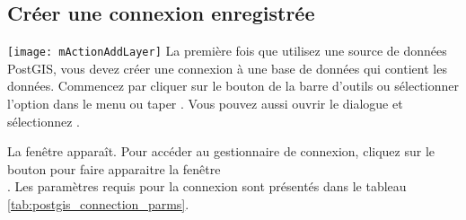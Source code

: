 \subsection{Créer une connexion enregistrée}  
\label{sec:postgis_stored}

\texttt{[image: mActionAddLayer]} La première fois que utilisez 
une source de données PostGIS, vous devez créer une connexion à une base de 
données \psq qui contient les données. Commencez par cliquer sur le bouton 
 de la barre d'outils 
ou sélectionner l'option  dans le menu  ou taper 
. Vous pouvez aussi ouvrir le dialogue 
 et sélectionnez 
.

La fenêtre  apparaît. Pour 
accéder au gestionnaire de connexion, cliquez sur le bouton  pour faire apparaitre 
la fenêtre\\ . Les paramètres 
requis pour la connexion sont présentés dans le tableau \ref{tab:postgis_connection_parms}.

